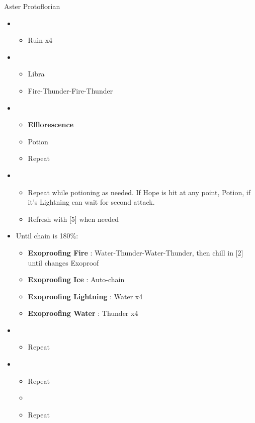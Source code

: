 \documentclass{report}
\begin{document}
\begin{battle}{Aster Protoflorian}
\begin{itemize}
    \item \first
    \begin{itemize}
        \item Ruin x4
    \end{itemize}
    \item \third
    \begin{itemize}
        \item Libra
        \item Fire-Thunder-Fire-Thunder
    \end{itemize}
    \item \first
    \begin{itemize}
        \item \textbf{Efflorescence}
        \item Potion
        \item Repeat
    \end{itemize}
    \item \fourth
    \begin{itemize}
        \item Repeat while potioning as needed. If Hope is hit at any point, Potion, if it's Lightning can wait for second attack.
        \item Refresh with [5] when needed
    \end{itemize}
    \item Until chain is 180\%:
    \begin{itemize}
        \item \textbf{Exoproofing Fire} : Water-Thunder-Water-Thunder, then chill in [2] until changes Exoproof
        \item \textbf{Exoproofing Ice} : Auto-chain
        \item \textbf{Exoproofing Lightning} : Water x4
        \item \textbf{Exoproofing Water} : Thunder x4
    \end{itemize}
    \item \second
    \begin{itemize}
        \item Repeat
    \end{itemize}
    \item \fourth
    \begin{itemize}
        \item Repeat
        \item \stagger
        \item Repeat

\end{itemize}
\end{itemize}
\end{battle}
\end{document}
